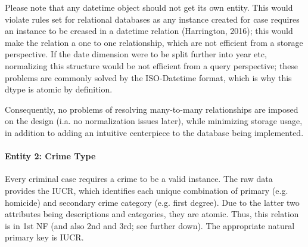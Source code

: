 \documentclass[a4paper]{article}
\begin{document}
Please note that any datetime object should not get its own entity. This would violate rules set for relational databases as any instance created for case requires an instance to be creased in a datetime relation (Harrington, 2016); this would make the relation a one to one relationship, which are not efficient from a storage perspective. If the date dimension were to be split further into year etc, normalizing this structure would be not efficient from a query perspective; these problems are commonly solved by the ISO-Datetime format, which is why this dtype is atomic by definition.
 
Consequently, no problems of resolving many-to-many relationships are imposed on the design (i.a. no normalization issues later), while minimizing storage usage, in addition to adding an intuitive centerpiece to the database being implemented.  
 


\paragraph{Entity 2: Crime Type} Every criminal case requires a crime to be a valid instance. The raw data provides the IUCR, which identifies each unique combination of primary (e.g. homicide) and secondary crime category (e.g. first degree). Due to the latter two attributes being descriptions and categories, they are atomic. Thus, this relation is in 1st NF (and also 2nd and 3rd; see further down). The appropriate natural primary key is IUCR. 
\end{document}
